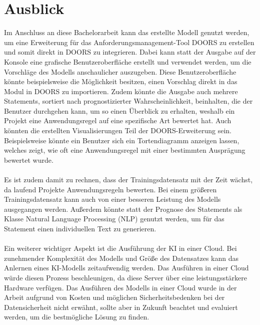 \section{Ausblick}
\label{chap:Ausblick}
Im Anschluss an diese Bachelorarbeit kann das erstellte Modell genutzt werden, um eine Erweiterung für das Anforderungsmanagement-Tool \ac{DOORS} zu erstellen
und somit direkt in \ac{DOORS} zu integrieren.
Dabei kann statt der Ausgabe auf der Konsole eine grafische Benutzeroberfläche erstellt und verwendet werden, um die Vorschläge des Modells anschaulicher auszugeben.
Diese Benutzeroberfläche könnte beispielsweise die Möglichkeit besitzen, einen Vorschlag direkt in das Modul in \ac{DOORS} zu importieren. 
Zudem könnte die Ausgabe auch mehrere Statements, sortiert nach prognostizierter Wahrscheinlichkeit, beinhalten, die der Benutzer durchgehen kann, um so einen Überblick 
zu erhalten, weshalb ein Projekt eine Anwendungsregel auf eine spezifische Art bewertet hat. Auch könnten die erstellten Visualisierungen Teil der \ac{DOORS}-Erweiterung sein.
Beispielsweise könnte ein Benutzer sich ein Tortendiagramm anzeigen lassen, welches zeigt, wie oft eine Anwendungsregel mit einer bestimmten Ausprägung bewertet wurde.
\\ \\
Es ist zudem damit zu rechnen, dass der Trainingsdatensatz mit der Zeit wächst, da laufend Projekte Anwendungsregeln bewerten. Bei einem größeren Trainingsdatensatz 
kann auch von einer besseren Leistung des Modells ausgegangen werden. Außerdem könnte statt der Prognose des Statements als Klasse Natural Language Processing (NLP) genutzt werden, 
um für das Statement einen individuellen Text zu generieren. 
\\ \\
Ein weiterer wichtiger Aspekt ist die Ausführung der \ac{KI} in einer Cloud. Bei zunehmender Komplexität des Modells und Größe des Datensatzes 
kann das Anlernen eines \ac{KI}-Modells zeitaufwendig werden. Das Ausführen in einer Cloud würde diesen Prozess beschleunigen,
da diese Server über eine leistungsstärkere Hardware verfügen. Das Ausführen des Modells in einer Cloud wurde in der Arbeit aufgrund von 
Kosten und möglichen Sicherheitsbedenken bei der Datensicherheit nicht erwähnt, sollte aber in Zukunft beachtet und evaluiert werden, um die bestmögliche Lösung zu finden. 